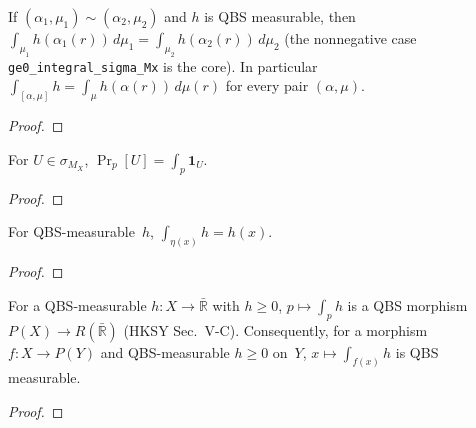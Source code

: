 \begin{lemma}\label{lem:integral_sigma_Mx}
  \rocqok
  If $(\alpha_1, \mu_1) \sim (\alpha_2, \mu_2)$ and $h$ is QBS measurable,
  then $\int_{\mu_1} h(\alpha_1(r))\, d\mu_1 =
  \int_{\mu_2} h(\alpha_2(r))\, d\mu_2$ (the nonnegative case
  \texttt{ge0\_integral\_sigma\_Mx} is the core). In particular
  $\int_{[\alpha, \mu]} h = \int_\mu h(\alpha(r))\, d\mu(r)$ for every pair
  $(\alpha, \mu)$.
\end{lemma}
\begin{proof}\rocqok\end{proof}

\begin{lemma}\label{lem:qbs_event_integral}
  \rocqok
  For $U \in \sigma_{M_X}$, $\Pr_p[U] = \int_p \mathbf{1}_U$.
\end{lemma}
\begin{proof}\rocqok\end{proof}

\begin{lemma}\label{lem:qbs_return_integral}
  \rocqok
  For QBS-measurable~$h$, $\int_{\eta(x)} h = h(x)$.
\end{lemma}
\begin{proof}\rocqok\end{proof}

\begin{theorem}\label{thm:ge0_qbs_morphism_integral}
  \rocqok
  For a QBS-measurable $h : X \to \bar{\mathbb{R}}$ with $h \geq 0$,
  $p \mapsto \int_p h$ is a QBS morphism
  $P(X) \to R(\bar{\mathbb{R}})$ (HKSY Sec.~V-C). Consequently, for a
  morphism $f : X \to P(Y)$ and QBS-measurable $h \geq 0$ on~$Y$,
  $x \mapsto \int_{f(x)} h$ is QBS measurable.
\end{theorem}
\begin{proof}\rocqok\end{proof}


